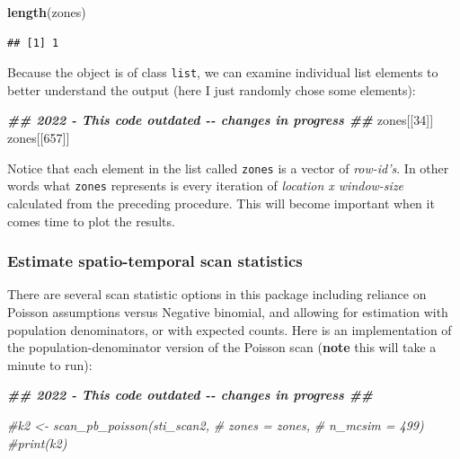 \documentclass[
]{book}
\newenvironment{Shaded}{\begin{snugshade}}{\end{snugshade}}
\newcommand{\CommentTok}[1]{\textcolor[rgb]{0.56,0.35,0.01}{\textit{#1}}}
\newcommand{\DecValTok}[1]{\textcolor[rgb]{0.00,0.00,0.81}{#1}}
\newcommand{\DocumentationTok}[1]{\textcolor[rgb]{0.56,0.35,0.01}{\textbf{\textit{#1}}}}
\newcommand{\FunctionTok}[1]{\textcolor[rgb]{0.13,0.29,0.53}{\textbf{#1}}}
\newcommand{\NormalTok}[1]{#1}
\begin{document}
\begin{Shaded}
\begin{Highlighting}[]
\FunctionTok{length}\NormalTok{(zones)}
\end{Highlighting}
\end{Shaded}

\begin{verbatim}
## [1] 1
\end{verbatim}

Because the object is of class \texttt{list}, we can examine individual list elements to better understand the output (here I just randomly chose some elements):

\begin{Shaded}
\begin{Highlighting}[]
\DocumentationTok{\#\# 2022 {-} This code outdated {-}{-} changes in progress \#\#}
\NormalTok{zones[[}\DecValTok{34}\NormalTok{]]}
\NormalTok{zones[[}\DecValTok{657}\NormalTok{]]}
\end{Highlighting}
\end{Shaded}

Notice that each element in the list called \texttt{zones} is a vector of \emph{row-id's}. In other words what \texttt{zones} represents is every iteration of \emph{location x window-size} calculated from the preceding procedure. This will become important when it comes time to plot the results.

\hypertarget{estimate-spatio-temporal-scan-statistics}{%
\subsubsection{Estimate spatio-temporal scan statistics}\label{estimate-spatio-temporal-scan-statistics}}

There are several scan statistic options in this package including reliance on Poisson assumptions versus Negative binomial, and allowing for estimation with population denominators, or with expected counts. Here is an implementation of the population-denominator version of the Poisson scan (\textbf{note} this will take a minute to run):

\begin{Shaded}
\begin{Highlighting}[]
\DocumentationTok{\#\# 2022 {-} This code outdated {-}{-} changes in progress \#\#}

\CommentTok{\#k2 \textless{}{-} scan\_pb\_poisson(sti\_scan2, }
\CommentTok{\#                      zones = zones,}
\CommentTok{\#                      n\_mcsim = 499)}
\CommentTok{\#print(k2)}
\end{Highlighting}
\end{Shaded}
\end{document}
